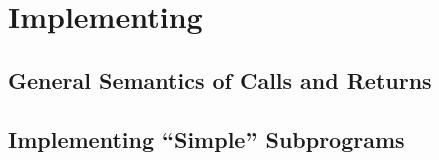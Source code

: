 \section{Implementing }\label{sec:Implementing_Subprograms}
\subsection{General Semantics of Calls and Returns}\label{subsec:Semantics_of_Calls_and_Returns}
\subsection{Implementing ``Simple'' Subprograms}\label{subsec:Implementing_Simple_Subprograms}
